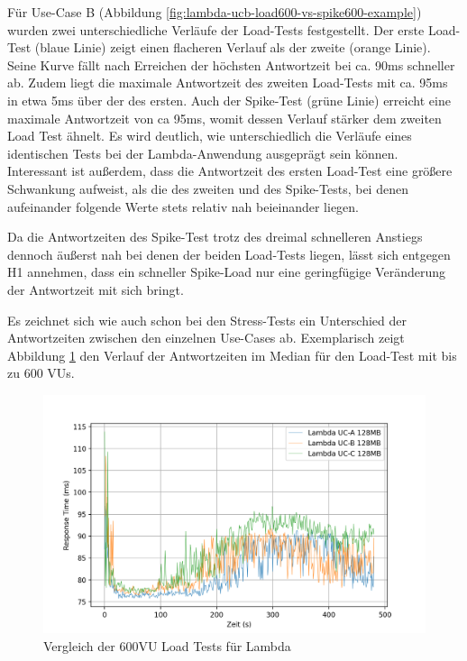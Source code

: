 Für Use-Case B (Abbildung \ref{fig:lambda-ucb-load600-vs-spike600-example}) wurden zwei unterschiedliche Verläufe der Load-Tests festgestellt. Der erste Load-Test (blaue Linie) zeigt einen flacheren Verlauf als der zweite (orange Linie). Seine Kurve fällt nach Erreichen der höchsten Antwortzeit bei ca. 90ms schneller ab. Zudem liegt die maximale Antwortzeit des zweiten Load-Tests mit ca. 95ms in etwa 5ms über der des ersten. Auch der Spike-Test (grüne Linie) erreicht eine maximale Antwortzeit von ca 95ms, womit dessen Verlauf stärker dem zweiten Load Test ähnelt. Es wird deutlich, wie unterschiedlich die Verläufe eines identischen Tests bei der Lambda-Anwendung ausgeprägt sein können. Interessant ist außerdem, dass die Antwortzeit des ersten Load-Test eine größere Schwankung aufweist, als die des zweiten und des Spike-Tests, bei denen aufeinander folgende Werte stets relativ nah beieinander liegen.

Da die Antwortzeiten des Spike-Test trotz des dreimal schnelleren Anstiegs dennoch äußerst nah bei denen der beiden Load-Tests liegen, lässt sich entgegen H1 annehmen, dass ein schneller Spike-Load nur eine geringfügige Veränderung der Antwortzeit mit sich bringt. 

Es zeichnet sich wie auch schon bei den Stress-Tests ein Unterschied der Antwortzeiten zwischen den einzelnen Use-Cases ab. Exemplarisch zeigt Abbildung \ref{fig:lambda128-load600-uc-comparison} den Verlauf der Antwortzeiten im Median für den Load-Test mit bis zu 600 VUs.

\begin{figure}[H]
    \includegraphics[width=\textwidth]{img/lambda128-load600-uc-comparison.png}
    \caption[Vergleich der 600VU Load Tests für Lambda]{Vergleich der 600VU Load Tests für Lambda}
    \label{fig:lambda128-load600-uc-comparison}
\end{figure}

